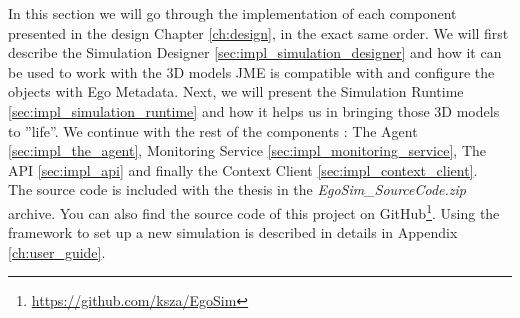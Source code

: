 In this section we will go through the implementation of each component presented in the design Chapter \ref{ch:design}, in the exact same order. We will first describe the Simulation Designer \ref{sec:impl_simulation_designer} and how it can be used to work with the 3D models JME is compatible with and configure the objects with Ego Metadata. Next, we will present the Simulation Runtime \ref{sec:impl_simulation_runtime} and how it helps us in bringing those 3D models to ''life''. We continue with the rest of the components : The Agent \ref{sec:impl_the_agent}, Monitoring Service \ref{sec:impl_monitoring_service}, The API \ref{sec:impl_api} and finally the Context Client \ref{sec:impl_context_client}.\\

The source code is included with the thesis in the \emph{EgoSim\_SourceCode.zip} archive. You can also find the source code of this project on GitHub\footnote{\url{https://github.com/ksza/EgoSim}}. Using the framework to set up a new simulation is described in details in Appendix \ref{ch:user_guide}.\\












